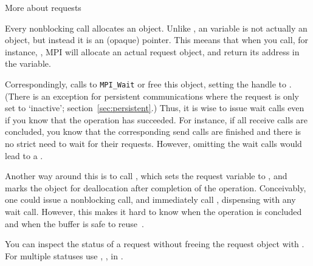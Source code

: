  {More about requests}
\label{ref:mpirequest}

Every nonblocking call allocates an 
object.
Unlike ,
an  variable is not actually an object,
but instead it is an (opaque) pointer.
This meeans that when you call, for instance, ,
MPI will allocate an actual request object, and return its
address in the  variable.

Correspondingly, calls to \lstinline{MPI_Wait} or 
free this object,
setting the handle to .
(There is an exception for persistent communications where
the request is only set to `inactive'; section~\ref{sec:persistent}.)
Thus, it is wise to issue wait calls even
if you know that the operation has succeeded. For instance, if all
receive calls are concluded, you know that the corresponding send
calls are finished and there is no strict need to wait for their
requests. However, omitting the wait calls would lead to a
.

Another way around this is to call ,
which sets the request variable to ,
and marks the object for deallocation after completion of the
operation. Conceivably, one could issue a nonblocking call,
and immediately call , dispensing
with any wait call. However, this makes it hard to know when the operation
is concluded and when the buffer is safe to reuse~\cite{Squyres:evilrequest}.

You can inspect the status of a request without freeing the request object
with .
For multiple statuses use
,
,
in .



